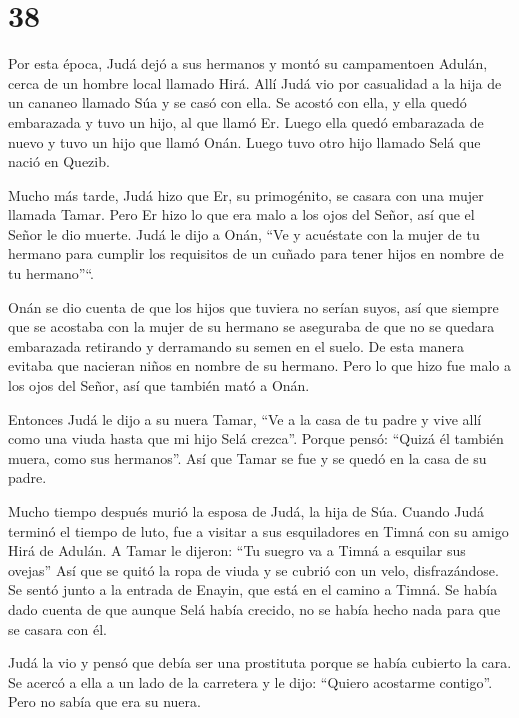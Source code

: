 \hypertarget{section-37}{%
\section{38}\label{section-37}}

 Por esta época, Judá dejó a sus hermanos y montó su
campamentoen Adulán, cerca de un hombre local llamado Hirá. 
Allí Judá vio por casualidad a la hija de un cananeo llamado Súa y se
casó con ella. Se acostó con ella,  y ella quedó embarazada
y tuvo un hijo, al que llamó Er.  Luego ella quedó
embarazada de nuevo y tuvo un hijo que llamó Onán.  Luego
tuvo otro hijo llamado Selá que nació en Quezib.

 Mucho más tarde, Judá hizo que Er, su primogénito, se
casara con una mujer llamada Tamar.  Pero Er hizo lo que era
malo a los ojos del Señor, así que el Señor le dio muerte. 
Judá le dijo a Onán, ``Ve y acuéstate con la mujer de tu hermano para
cumplir los requisitos de un cuñado para tener hijos en nombre de tu
hermano''``.

 Onán se dio cuenta de que los hijos que tuviera no serían
suyos, así que siempre que se acostaba con la mujer de su hermano se
aseguraba de que no se quedara embarazada retirando y derramando su
semen en el suelo. De esta manera evitaba que nacieran niños en nombre
de su hermano.  Pero lo que hizo fue malo a los ojos del
Señor, así que también mató a Onán.

 Entonces Judá le dijo a su nuera Tamar, ``Ve a la casa de
tu padre y vive allí como una viuda hasta que mi hijo Selá crezca''.
Porque pensó: ``Quizá él también muera, como sus hermanos''. Así que
Tamar se fue y se quedó en la casa de su padre.

 Mucho tiempo después murió la esposa de Judá, la hija de
Súa. Cuando Judá terminó el tiempo de luto, fue a visitar a sus
esquiladores en Timná con su amigo Hirá de Adulán.  A Tamar
le dijeron: ``Tu suegro va a Timná a esquilar sus ovejas'' 
Así que se quitó la ropa de viuda y se cubrió con un velo,
disfrazándose. Se sentó junto a la entrada de Enayin, que está en el
camino a Timná. Se había dado cuenta de que aunque Selá había crecido,
no se había hecho nada para que se casara con él.

 Judá la vio y pensó que debía ser una prostituta porque se
había cubierto la cara.  Se acercó a ella a un lado de la
carretera y le dijo: ``Quiero acostarme contigo''. Pero no sabía que era
su nuera.

